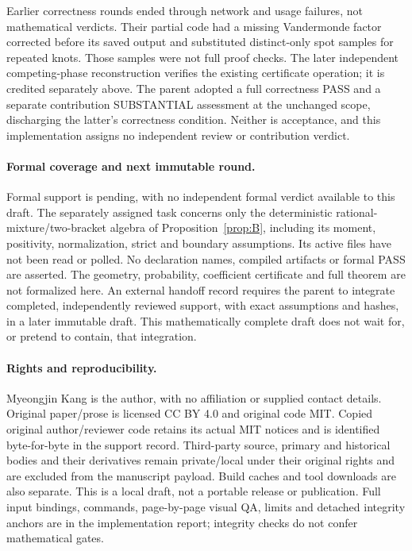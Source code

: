\documentclass[11pt]{article}
\theoremstyle{remark}\newtheorem{remark}[theorem]{Remark}
\numberwithin{equation}{section}
\begin{document}
Earlier correctness rounds ended through network and usage failures,
not mathematical verdicts. Their partial code had a missing Vandermonde
factor corrected before its saved output and substituted distinct-only
spot samples for repeated knots. Those samples were not full proof
checks. The later independent competing-phase reconstruction verifies
the existing certificate operation; it is credited separately above.
The parent adopted a full correctness PASS and a separate contribution
SUBSTANTIAL assessment at the unchanged scope, discharging the latter's
correctness condition. Neither is acceptance, and this implementation
assigns no independent review or contribution verdict.

\paragraph{Formal coverage and next immutable round.}
Formal support is pending, with no independent formal verdict available
to this draft. The separately assigned task concerns only the deterministic
rational-mixture/two-bracket algebra of Proposition~\ref{prop:B}, including
its moment, positivity, normalization, strict and boundary assumptions.
Its active files have not been read or polled. No declaration names,
compiled artifacts or formal PASS are asserted. The geometry, probability,
coefficient certificate and full theorem are not formalized here.
An external handoff record requires the parent to integrate completed,
independently reviewed support, with exact assumptions and hashes, in a
later immutable draft. This mathematically complete draft does not wait
for, or pretend to contain, that integration.

\paragraph{Rights and reproducibility.}
Myeongjin Kang is the author, with no affiliation or supplied contact
details. Original paper/prose is licensed CC BY 4.0 and original code MIT.
Copied original author/reviewer code retains its actual MIT notices and
is identified byte-for-byte in the support record. Third-party source,
primary and historical bodies and their derivatives remain private/local
under their original rights and are excluded from the manuscript payload.
Build caches and tool downloads are also separate. This is a local draft,
not a portable release or publication. Full input bindings, commands,
page-by-page visual QA, limits and detached integrity anchors are in the
implementation report; integrity checks do not confer mathematical gates.


\end{document}
